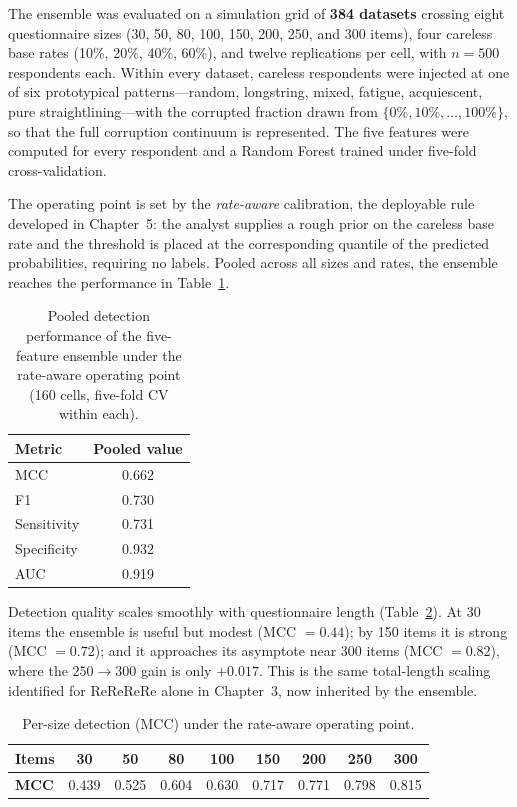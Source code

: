 \documentclass[doc,11pt,donotrepeattitle]{apa7}
\begin{document}
The ensemble was evaluated on a simulation grid of \textbf{384 datasets}
crossing eight questionnaire sizes (30, 50, 80, 100, 150, 200, 250, and 300
items), four careless base rates (10\%, 20\%, 40\%, 60\%), and twelve
replications per cell, with $n = 500$ respondents each. Within every dataset,
careless respondents were injected at one of six prototypical patterns---random,
longstring, mixed, fatigue, acquiescent, pure straightlining---with the
corrupted fraction drawn from $\{0\%, 10\%, \dots, 100\%\}$, so that the full
corruption continuum is represented. The five features were computed for every
respondent and a Random Forest trained under five-fold cross-validation.

The operating point is set by the \emph{rate-aware} calibration, the deployable
rule developed in Chapter~5: the analyst supplies a rough prior on the careless
base rate and the threshold is placed at the corresponding quantile of the
predicted probabilities, requiring no labels. Pooled across all sizes and rates,
the ensemble reaches the performance in Table~\ref{tab:headline}.

\begin{table}[t]
\centering
\caption{Pooled detection performance of the five-feature ensemble under the
rate-aware operating point (160 cells, five-fold CV within each).}
\label{tab:headline}
\small
\begin{tabular}{l c}
\toprule
\textbf{Metric} & \textbf{Pooled value} \\
\midrule
MCC          & 0.662 \\
F1           & 0.730 \\
Sensitivity  & 0.731 \\
Specificity  & 0.932 \\
AUC          & 0.919 \\
\bottomrule
\end{tabular}
\end{table}

Detection quality scales smoothly with questionnaire length
(Table~\ref{tab:scaling}). At 30 items the ensemble is useful but modest
(MCC $= 0.44$); by 150 items it is strong (MCC $= 0.72$); and it approaches its
asymptote near 300 items (MCC $= 0.82$), where the $250 \rightarrow 300$ gain is
only $+0.017$. This is the same total-length scaling identified for ReReReRe
alone in Chapter~3, now inherited by the ensemble.

\begin{table}[t]
\centering
\caption{Per-size detection (MCC) under the rate-aware operating point.}
\label{tab:scaling}
\small
\begin{tabular}{l c c c c c c c c}
\toprule
\textbf{Items} & 30 & 50 & 80 & 100 & 150 & 200 & 250 & 300 \\
\midrule
\textbf{MCC} & 0.439 & 0.525 & 0.604 & 0.630 & 0.717 & 0.771 & 0.798 & 0.815 \\
\bottomrule
\end{tabular}
\end{table}
\end{document}
